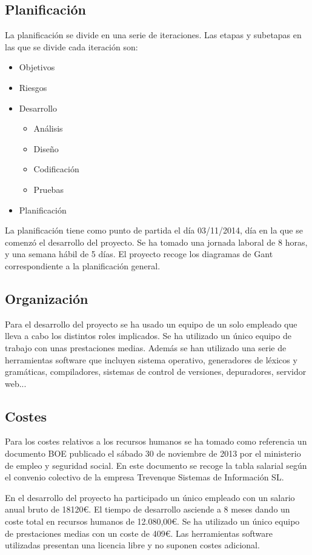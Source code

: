 \subsection{Planificación}
La planificación se divide en una serie de iteraciones. Las etapas y subetapas en las que se divide cada iteración son:

\begin {itemize}
\item Objetivos
\item Riesgos
\item Desarrollo
\begin{itemize}
\item Análisis
\item Diseño
\item Codificación
\item Pruebas
\end{itemize}
\item Planificación
\end {itemize}

La planificación tiene como punto de partida el día 03/11/2014, día en la que se 
comenzó el desarrollo del proyecto. Se ha tomado una jornada laboral de 8 horas, 
y una semana hábil de 5 días. El proyecto recoge los diagramas de Gant correspondiente a la planificación general.

\subsection{Organización}
Para el desarrollo del proyecto se ha usado un equipo de un solo empleado que lleva a cabo los distintos roles implicados. Se ha utilizado 
un único equipo de trabajo con unas prestaciones medias. Además se han utilizado una serie de herramientas software que incluyen sistema operativo, 
generadores de léxicos y gramáticas, compiladores, sistemas de control de versiones, depuradores, servidor web...

\subsection{Costes}
Para los costes relativos a los recursos humanos se ha tomado como referencia un documento BOE publicado el sábado 30 de noviembre de 2013
por el ministerio de empleo y seguridad social. En este documento se recoge la tabla salarial según el convenio colectivo de la empresa 
Trevenque Sistemas de Información SL.

En el desarrollo del proyecto ha participado un único empleado con un salario anual bruto de 18120\euro. El tiempo de desarrollo asciende a 8 meses dando un coste total
en recursos humanos de  12.080,00\euro. Se ha utilizado un único equipo de prestaciones medias con un coste de 409\euro. Las herramientas software utilizadas presentan una licencia
libre y no suponen costes adicional.

